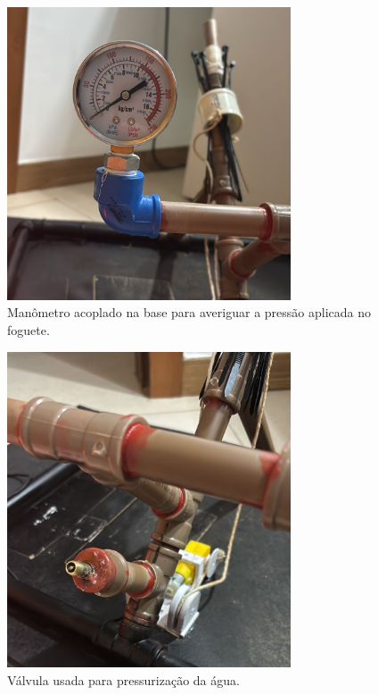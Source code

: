 \begin{figure}[H]
	\centering
	\includegraphics[width=0.75\textwidth,height=\textheight,keepaspectratio]{figuras/estruturas/pressurizador.png}
	\caption{Manômetro acoplado na base para averiguar a pressão aplicada no foguete. }
	\label{fig_pressurizador_foguete}
\end{figure}

\begin{figure}[H]
	\centering
	\includegraphics[width=0.75\textwidth,height=\textheight,keepaspectratio]{figuras/estruturas/valvula.png}
	\caption{Válvula usada para pressurização da água.}
	\label{fig_valvula_foguete}
\end{figure}

